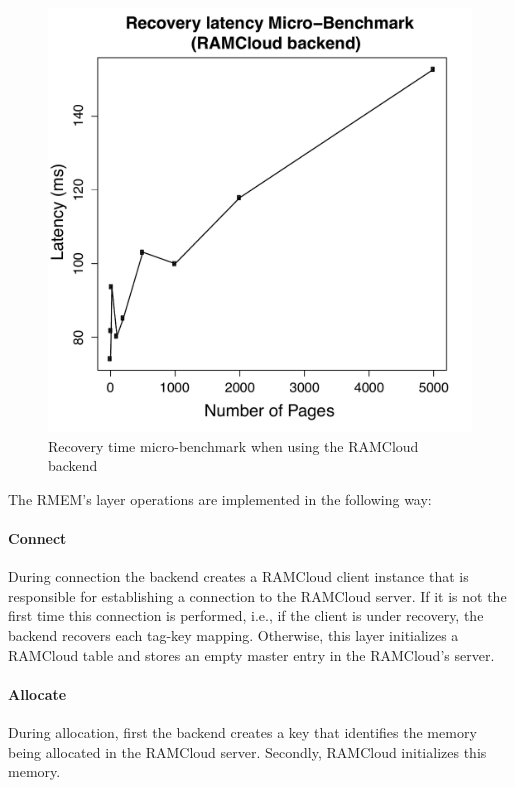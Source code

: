 \begin{figure}[t!]
\begin{center}
\includegraphics[scale=0.40]{graphs/recovery_time_rc_latencies.pdf}
\end{center}
\caption{Recovery time micro-benchmark when using the RAMCloud backend}
\label{fig:rc-recovery-ubm}
\end{figure}


The RMEM's layer operations are implemented in the following way:

\paragraph {\bf Connect} During connection the backend creates a RAMCloud client instance that is responsible for establishing a connection to the RAMCloud server.
If it is not the first time this connection is performed, i.e., if the client is under recovery, the backend recovers each tag-key mapping.
Otherwise, this layer initializes a RAMCloud table and stores an empty master entry in the RAMCloud's server.
\paragraph{\bf Allocate} During allocation, first the backend creates a key that identifies the memory being allocated in the RAMCloud server. Secondly, RAMCloud initializes this memory.
